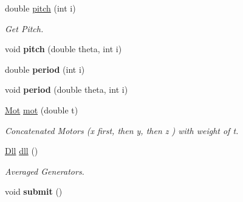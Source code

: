 \begin{DoxyCompactItemize}
\item 
\hypertarget{classvsr_1_1_n_twist_ab89167f2eed25e1149d87a09513cdd90}{double \hyperlink{classvsr_1_1_n_twist_ab89167f2eed25e1149d87a09513cdd90}{pitch} (int i)}\label{classvsr_1_1_n_twist_ab89167f2eed25e1149d87a09513cdd90}

\begin{DoxyCompactList}\small\item\em Get Pitch. \end{DoxyCompactList}\item 
\hypertarget{classvsr_1_1_n_twist_a3b2e35be556a9eb2428503de6ea6c551}{void {\bfseries pitch} (double theta, int i)}\label{classvsr_1_1_n_twist_a3b2e35be556a9eb2428503de6ea6c551}

\item 
\hypertarget{classvsr_1_1_n_twist_a66aa29ea5985c18899813caf0ac3b8b7}{double {\bfseries period} (int i)}\label{classvsr_1_1_n_twist_a66aa29ea5985c18899813caf0ac3b8b7}

\item 
\hypertarget{classvsr_1_1_n_twist_aaa31185ad2c4c773d25da1d285cbb6ec}{void {\bfseries period} (double theta, int i)}\label{classvsr_1_1_n_twist_aaa31185ad2c4c773d25da1d285cbb6ec}

\item 
\hypertarget{classvsr_1_1_n_twist_aacd1db5a232a9f7ce8a1ded141fa20b7}{\hyperlink{namespacevsr_ad4b77d620ed90deefbeab9d4a122667e}{Mot} \hyperlink{classvsr_1_1_n_twist_aacd1db5a232a9f7ce8a1ded141fa20b7}{mot} (double t)}\label{classvsr_1_1_n_twist_aacd1db5a232a9f7ce8a1ded141fa20b7}

\begin{DoxyCompactList}\small\item\em Concatenated Motors (x first, then y, then z ) with weight of t. \end{DoxyCompactList}\item 
\hypertarget{classvsr_1_1_n_twist_a4cfffd4b6e7007884d2ae61e3f1ab2f9}{\hyperlink{namespacevsr_a6c6892b7aec25cfb16492501e2e35b11}{Dll} \hyperlink{classvsr_1_1_n_twist_a4cfffd4b6e7007884d2ae61e3f1ab2f9}{dll} ()}\label{classvsr_1_1_n_twist_a4cfffd4b6e7007884d2ae61e3f1ab2f9}

\begin{DoxyCompactList}\small\item\em Averaged Generators. \end{DoxyCompactList}\item 
\hypertarget{classvsr_1_1_n_twist_aa05bbba03aad8ba297de201d6cc20149}{void {\bfseries submit} ()}\label{classvsr_1_1_n_twist_aa05bbba03aad8ba297de201d6cc20149}


\end{DoxyCompactItemize}
